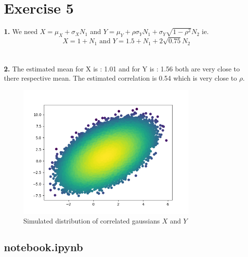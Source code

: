 \documentclass{article}
\begin{document}
\section*{Exercise 5}
\textbf{1.} We need $X = \mu_X + \sigma_XN_1$ and $Y = \mu_Y+ \rho \sigma_YN_1+ \sigma_Y \sqrt{1-\rho^2}N_2$
 ie. $$\boxed{X= 1+N_1\text{ and }Y = 1.5+ N_1+ 2\sqrt{0.75}N_2}$$
\\\\
\textbf{2.} The estimated mean for X is : 1.01 and for Y is : 1.56 both are very close to there respective mean. The estimated correlation is 0.54 which is very close to $\rho$.
\begin{figure}[H]
    \begin{center}
        \includegraphics[width = 9cm]{img/Gaussian_Cholevsky.png}
    \end{center}
    \label{label:Gaussian_cholevsky}
    \caption{Simulated distribution of correlated gaussians $X$ and $Y$}
\end{figure}
\begin{appendix}
    \section{notebook.ipynb}
    
\end{appendix}
\end{document}
